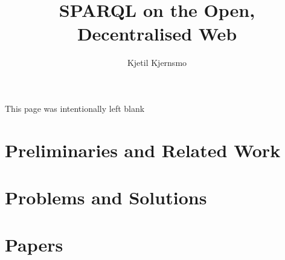 \documentclass[a4paper, 12pt, twoside]{uiophd}
\begin{document}
\title{SPARQL on the Open, Decentralised Web}
\author{Kjetil Kjernsmo}


\frontmatter
\maketitle
\newpage
This page was intentionally left blank
\newpage



\tableofcontents
\mainmatter






\chapter{Preliminaries and Related Work}



\chapter{Problems and Solutions}









\chapter{Papers}







\end{document}
